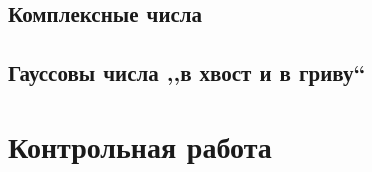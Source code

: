 \documentclass[10pt, twoside]{article}
\begin{document}
\subsection{Комплексные числа}
% 
\subsection{Гауссовы числа ,,в хвост и в гриву``} %

\newpage
{}
\section*{Контрольная работа}
% 
\end{document}
